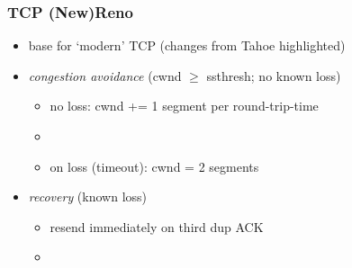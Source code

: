 \begin{frame}
\frametitle{TCP (New)Reno}
\begin{itemize}
    \item base for `modern' TCP (changes from Tahoe highlighted)
    \item \textit{congestion avoidance} (cwnd $\ge$ ssthresh; no known loss)
        \begin{itemize}
        \item no loss: cwnd += 1 segment per round-trip-time
        \item {}
        \item on loss (timeout): cwnd = 2 segments
        \end{itemize}
    \item \textit{recovery} (known loss)
        \begin{itemize}
        \item resend immediately on third dup ACK
        \item {}
        \end{itemize}
    \end{itemize}
\end{frame}
